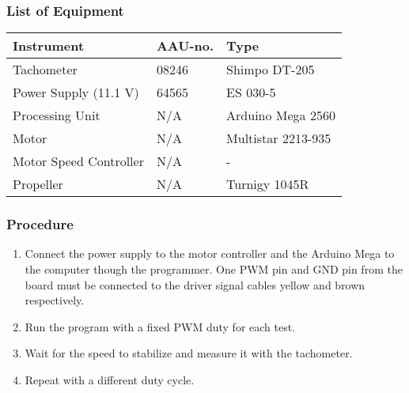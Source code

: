 \subsubsection{List of Equipment}
\begin{table}[H]
	\begin{tabular}{|l|l|p{4.3cm}|}
		\hline%
		\textbf{Instrument}                          &  \textbf{AAU-no.}  &  \textbf{Type}                       \\
		\hline%
		Tachometer                                   &  08246             &  Shimpo DT-205		                   \\
		\hline%
	    Power Supply (11.1 V)                        &  64565             &  ES 030-5                 \\
		\hline%
		Processing Unit                              &  N/A               & Arduino Mega 2560    \\
		\hline%
		Motor                                        &  N/A               & Multistar 2213-935     \\
		\hline%
		Motor Speed Controller                       &  N/A               &  -      \\
		\hline%
		Propeller                                    &  N/A               & Turnigy 1045R     \\
		\hline%
	\end{tabular}
\end{table}

\subsubsection{Procedure}
\begin{enumerate}
	\item Connect the power supply to the motor controller and the Arduino Mega to the computer though the programmer. One PWM pin and GND pin from the board must be connected to the driver signal cables yellow and brown respectively. 
	\item Run the program with a fixed PWM duty for each test.
	\item Wait for the speed to stabilize and measure it with the tachometer. 
	\item Repeat with a different duty cycle.
\end{enumerate}

